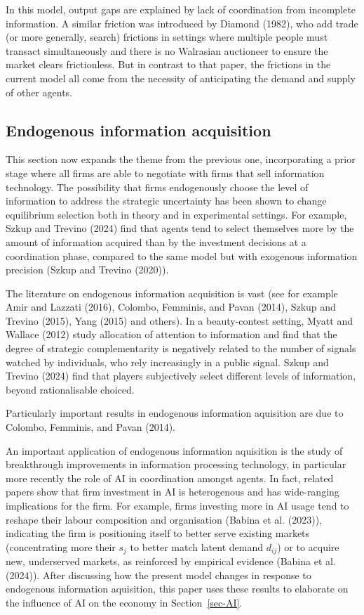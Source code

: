 \documentclass[
]{article}
\theoremstyle{plain}
\theoremstyle{definition}
\theoremstyle{remark}
\begin{document}
In this model, output gaps are explained by lack of coordination from
incomplete information. A similar friction was introduced by Diamond
(1982), who add trade (or more generally, search) frictions in settings
where multiple people must transact simultaneously and there is no
Walrasian auctioneer to ensure the market clears frictionless. But in
contrast to that paper, the frictions in the current model all come from
the necessity of anticipating the demand and supply of other agents.

\subsection{Endogenous information
acquisition}\label{endogenous-information-acquisition-1}

This section now expands the theme from the previous one, incorporating
a prior stage where all firms are able to negotiate with firms that sell
information technology. The possibility that firms endogenously choose
the level of information to address the strategic uncertainty has been
shown to change equilibrium selection both in theory and in experimental
settings. For example, Szkup and Trevino (2024) find that agents tend to
select themselves more by the amount of information acquired than by the
investment decisions at a coordination phase, compared to the same model
but with exogenous information precision (Szkup and Trevino (2020)).

The literature on endogenous information acquisition is vast (see for
example Amir and Lazzati (2016), Colombo, Femminis, and Pavan (2014),
Szkup and Trevino (2015), Yang (2015) and others). In a beauty-contest
setting, Myatt and Wallace (2012) study allocation of attention to
information and find that the degree of strategic complementarity is
negatively related to the number of signals watched by individuals, who
rely increasingly in a public signal. Szkup and Trevino (2024) find that
players subjectively select different levels of information, beyond
rationalisable choiced.

Particularly important results in endogenous information aquisition are
due to Colombo, Femminis, and Pavan (2014).

An important application of endogenous information aquisition is the
study of breakthrough improvements in information processing technology,
in particular more recently the role of AI in coordination amongst
agents. In fact, related papers show that firm investment in AI is
heterogenous and has wide-ranging implications for the firm. For
example, firms investing more in AI usage tend to reshape their labour
composition and organisation (Babina et al. (2023)), indicating the firm
is positioning itself to better serve existing markets (concentrating
more their \(s_j\) to better match latent demand \(d_{ij}\)) or to
acquire new, underserved markets, as reinforced by empirical evidence
(Babina et al. (2024)). After discussing how the present model changes
in response to endogenous information aquisition, this paper uses these
results to elaborate on the influence of AI on the economy in
Section~\ref{sec-AI}.
\end{document}

